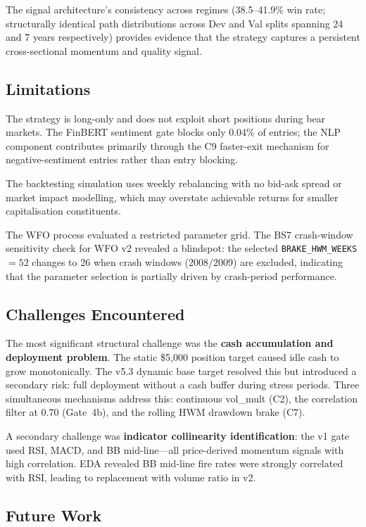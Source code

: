 \documentclass[11pt,twoside,a4paper]{article}
\begin{document}
The signal architecture's consistency across regimes (38.5--41.9\% win rate; structurally identical path distributions across Dev and Val splits spanning 24 and 7 years respectively) provides evidence that the strategy captures a persistent cross-sectional momentum and quality signal.

\subsection{Limitations}

The strategy is long-only and does not exploit short positions during bear markets. The FinBERT sentiment gate blocks only 0.04\% of entries; the NLP component contributes primarily through the C9 faster-exit mechanism for negative-sentiment entries rather than entry blocking.

The backtesting simulation uses weekly rebalancing with no bid-ask spread or market impact modelling, which may overstate achievable returns for smaller capitalisation constituents.

The WFO process evaluated a restricted parameter grid. The BS7 crash-window sensitivity check for WFO v2 revealed a blindspot: the selected \texttt{BRAKE\_HWM\_WEEKS}$=52$ changes to $26$ when crash windows (2008/2009) are excluded, indicating that the parameter selection is partially driven by crash-period performance.

\subsection{Challenges Encountered}

The most significant structural challenge was the \textbf{cash accumulation and deployment problem}. The static \$5,000 position target caused idle cash to grow monotonically. The v5.3 dynamic base target resolved this but introduced a secondary risk: full deployment without a cash buffer during stress periods. Three simultaneous mechanisms address this: continuous vol\_mult (C2), the correlation filter at 0.70 (Gate~4b), and the rolling HWM drawdown brake (C7).

A secondary challenge was \textbf{indicator collinearity identification}: the v1 gate used RSI, MACD, and BB mid-line---all price-derived momentum signals with high correlation. EDA revealed BB mid-line fire rates were strongly correlated with RSI, leading to replacement with volume ratio in v2.

\subsection{Future Work}
\end{document}
